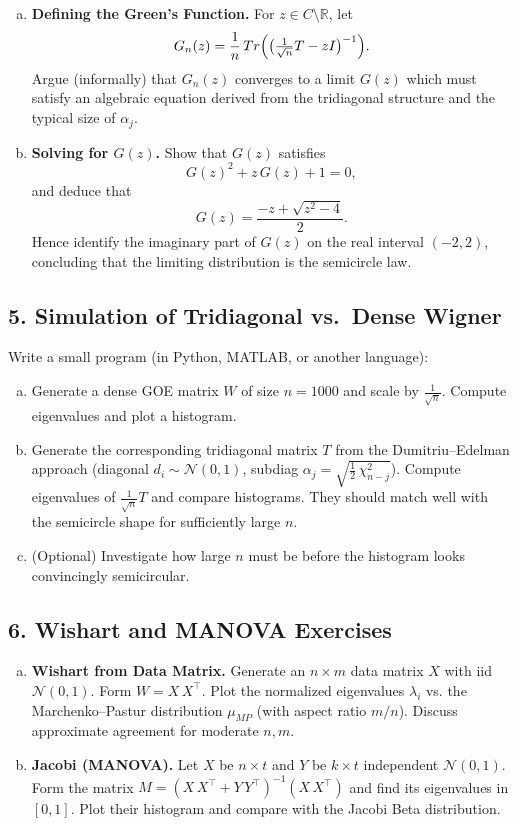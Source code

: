 \documentclass[letterpaper,11pt,oneside,reqno]{article}
\numberwithin{equation}{section}
\theoremstyle{definition}
\begin{document}
\begin{enumerate}[(a)]
\item {\bf Defining the Green’s Function.} For $z\in C\setminus\mathbb{R}$, let
\[
  G_n(z) = \frac{1}{n} \,Tr\Bigl(\bigl(\tfrac1{\sqrt{n}} T - z I\bigr)^{-1}\Bigr).
\]
Argue (informally) that $G_n(z)$ converges to a limit $G(z)$ which must satisfy an algebraic equation derived from the tridiagonal structure and the typical size of $\alpha_j$.
\item {\bf Solving for $G(z)$.} Show that $G(z)$ satisfies
\[
  G(z)^2 + z\,G(z) + 1 = 0,
\]
and deduce that
\[
  G(z) = \frac{-z + \sqrt{z^2-4}}{2}.
\]
Hence identify the imaginary part of $G(z)$ on the real interval $(-2,2)$, concluding that the limiting distribution is the semicircle law.
\end{enumerate}

\subsection*{5. Simulation of Tridiagonal vs.\ Dense Wigner}

Write a small program (in Python, MATLAB, or another language):
\begin{enumerate}[(a)]
\item Generate a dense GOE matrix $W$ of size $n=1000$ and scale by $\frac{1}{\sqrt{n}}$. Compute eigenvalues and plot a histogram.
\item Generate the corresponding tridiagonal matrix $T$ from the Dumitriu--Edelman approach (diagonal $d_i\sim \mathcal{N}(0,1)$, subdiag $\alpha_j= \sqrt{\tfrac12\,\chi^2_{n-j}}$). Compute eigenvalues of $\frac{1}{\sqrt{n}}T$ and compare histograms. They should match well with the semicircle shape for sufficiently large $n$.
\item (Optional) Investigate how large $n$ must be before the histogram looks convincingly semicircular.
\end{enumerate}

\subsection*{6. Wishart and MANOVA Exercises}

\begin{enumerate}[(a)]
\item {\bf Wishart from Data Matrix.} Generate an $n\times m$ data matrix $X$ with iid $\mathcal{N}(0,1)$. Form $W=X\,X^\top$. Plot the normalized eigenvalues $\lambda_i$ vs. the Marchenko–Pastur distribution $\mu_{MP}$ (with aspect ratio $m/n$). Discuss approximate agreement for moderate $n,m$.
\item {\bf Jacobi (MANOVA).} Let $X$ be $n\times t$ and $Y$ be $k\times t$ independent $\mathcal{N}(0,1)$. Form the matrix $M=(X\,X^\top +Y\,Y^\top)^{-1} (X\,X^\top)$ and find its eigenvalues in $[0,1]$. Plot their histogram and compare with the Jacobi Beta distribution.
\end{enumerate}
\end{document}
